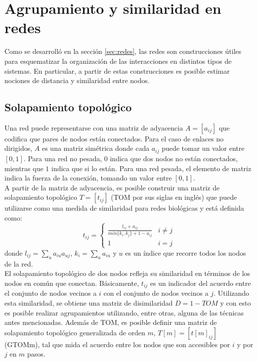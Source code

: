 \section{Agrupamiento y similaridad en redes}
Como se desarrolló en la sección \ref{sec:redes}, las redes son construcciones útiles para esquematizar la organización de las interacciones en distintos tipos de sistemas. En particular, a partir de estas construcciones es posible estimar nociones de distancia y similaridad entre nodos. 
\subsection{Solapamiento topológico}
Una red puede representarse con una matriz de adyacencia $A=[a_{ij}]$ que codifica que pares de nodos están conectados. Para el caso de enlaces no dirigidos, $A$ es una matriz simétrica donde cada $a_{ij}$ puede tomar un valor entre $[0, 1]$. Para una red no pesada, $0$ indica que dos nodos no están conectados, mientras que $1$ indica que si lo están. Para una red pesada, el elemento de matriz indica la fuerza de la conexión, tomando un valor entre $[0, 1]$.\\
A partir de la matriz de adyacencia, es posible construir una matriz de solapamiento topológico $T = [t_{ij}]$ (TOM por sus siglas en inglés) que puede utilizarse como una medida de similaridad para redes biológicas y está definida como:
\begin{equation}
t_{ij} = \begin{cases} 
      \frac{l_{ij}+a_{ij}}{min\{k_i,k_j\}+1-a_{ij}} & i\neq j \\
      1 & i=j 
\end{cases}
\end{equation}
donde $l_{ij} = \sum\limits_u a_{iu}a_{uj}$, $k_i = \sum\limits_u a_{iu}$ y $u$ es un índice que recorre todos los nodos de la red.\\
El solapamiento topológico de dos nodos refleja su similaridad en términos de los nodos en común que conectan. Básicamente, $t_{ij}$ es un indicador del acuerdo entre el conjunto de nodos vecinos a $i$ con el conjunto de nodos vecinos a $j$. Utilizando esta similaridad, se obtiene una matriz de disimilaridad $D = 1-TOM$ y con esto es posible realizar agrupamientos utilizando, entre otras, alguna de las técnicas antes mencionadas. Además de TOM, es posible definir una matriz de solapamiento topológico generalizada de orden $m$, $T[m] = [t[m]_{ij}]$ (GTOMm), tal que mida el acuerdo entre los nodos que son accesibles por $i$ y por $j$ en $m$ pasos.\cite{Horvath2007}\\
